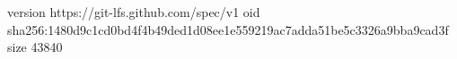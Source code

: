 version https://git-lfs.github.com/spec/v1
oid sha256:1480d9c1cd0bd4f4b49ded1d08ee1e559219ac7adda51be5c3326a9bba9cad3f
size 43840
